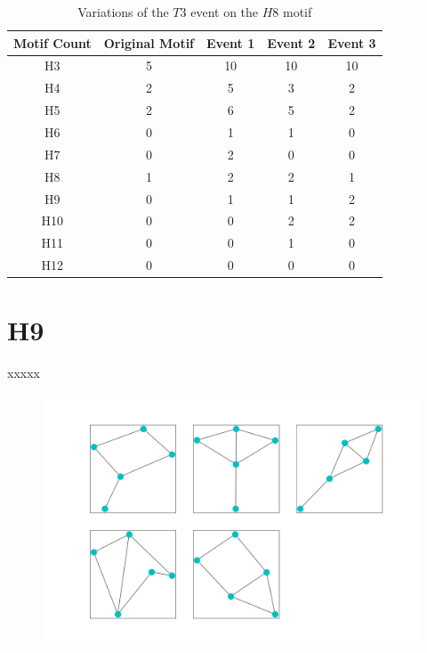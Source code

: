 \begin{table}
    \centering
    \begin{tabular}{||c c c c c||} 
    \hline
    Motif Count & Original Motif & Event 1 & Event 2 & Event 3 \\ [0.5ex] 
    \hline\hline
    H3 & 5 & 10 & 10 & 10\\ 
    \hline
    H4 & 2 & 5 & 3 & 2 \\
    \hline
    H5 & 2 & 6 & 5 & 2 \\
    \hline
    H6 & 0 & 1 & 1 & 0 \\
    \hline
    H7 & 0 & 2 & 0 & 0 \\
    \hline
    H8 & 1 & 2 & 2 & 1\\
    \hline
    H9 & 0 & 1 & 1 & 2\\
    \hline
    H10  & 0 & 0 & 2& 2 \\
    \hline
    H11  & 0 & 0 & 1& 0 \\
    \hline
    H12  & 0 & 0 & 0& 0 \\
    \hline
   \end{tabular}
   \caption{Variations of the $T3$ event on the $H8$ motif}
   \label{table:17}
\end{table}

\section{H9}
xxxxx

\begin{figure}
    \includegraphics[width=12cm]{Images/H9_T3_evolution.png}
    \centering
    
\end{figure}

